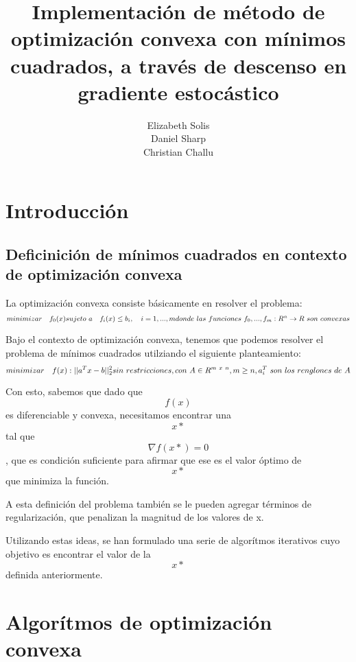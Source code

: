 \documentclass[]{article}
\title{Implementación de método de optimización convexa con mínimos cuadrados,
a través de descenso en gradiente estocástico}
\author{Elizabeth Solis \\ Daniel Sharp \\ Christian Challu}
\date{}
\begin{document}
\maketitle

\newpage

\tableofcontents

\newpage

\section{Introducción}

\subsection{Deficinición de mínimos cuadrados en contexto de optimización convexa}

La optimización convexa consiste básicamente en resolver el problema:\\
\[minimizar \quad f_0(x) \\
  sujeto \ a \quad f_i(x) \leq b_i, \quad i=1,...,m  \\
  donde \ las \ funciones \ f_0,...,f_m:R^n \to R \ son \ convexas\]

Bajo el contexto de optimización convexa, tenemos que podemos resolver
el problema de mínimos cuadrados utilziando el siguiente
planteamiento:\\
\[minimizar \quad f(x):||a^Tx -b||^2_2 \\
sin \ restricciones, \\
con \ A \in R^{m \ x \ n}, m \geq n, a_i^T \ son \ los \ renglones \ de \ A\]

Con esto, sabemos que dado que \[f(x)\] es diferenciable y convexa,
necesitamos encontrar una \[x*\] tal que \[\nabla f(x*) = 0\], que es
condición suficiente para afirmar que ese es el valor óptimo de \[x*\]
que minimiza la función.

A esta definición del problema también se le pueden agregar términos de
regularización, que penalizan la magnitud de los valores de x.

Utilizando estas ideas, se han formulado una serie de algorítmos
iterativos cuyo objetivo es encontrar el valor de la \[x*\] definida
anteriormente.

\newpage

\section{Algorítmos de optimización convexa}
\end{document}
